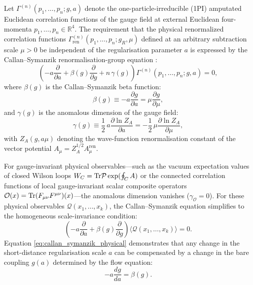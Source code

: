 Let $\Gamma^{(n)}(p_1, \dots, p_n; g, a)$ denote the one-particle-irreducible (1PI) amputated Euclidean correlation functions of the gauge field at external Euclidean four-momenta $p_1, \dots, p_n \in \mathbb{R}^4$. The requirement that the physical renormalized correlation functions $\Gamma_{\mathrm{ren}}^{(n)}(p_1, \dots, p_n; g_R, \mu)$ defined at an arbitrary subtraction scale $\mu > 0$ be independent of the regularisation parameter $a$ is expressed by the Callan--Symanzik renormalisation-group equation \cite{Callan1970,Symanzik1970}:
\begin{equation}
\label{eq:callan_symanzik}
\left( -a \frac{\partial}{\partial a} + \beta(g) \frac{\partial}{\partial g} + n \, \gamma(g) \right) \Gamma^{(n)}(p_1, \dots, p_n; g, a) = 0,
\end{equation}
where $\beta(g)$ is the Callan--Symanzik beta function:
\begin{equation}
\label{eq:beta_def}
\beta(g) \equiv -a \frac{\partial g}{\partial a} = \mu \frac{\partial g}{\partial \mu},
\end{equation}
and $\gamma(g)$ is the anomalous dimension of the gauge field:
\begin{equation}
\label{eq:gamma_def}
\gamma(g) \equiv \frac{1}{2} \, a \frac{\partial \ln Z_A}{\partial a} = -\frac{1}{2} \, \mu \frac{\partial \ln Z_A}{\partial \mu},
\end{equation}
with $Z_A(g, a\mu)$ denoting the wave-function renormalisation constant of the vector potential $A_\mu = Z_A^{1/2} A_{\mu}^{\mathrm{ren}}$.

For gauge-invariant physical observables—such as the vacuum expectation values of closed Wilson loops $W_C = \mathrm{Tr} \mathcal{P} \exp(\oint_C A)$ or the connected correlation functions of local gauge-invariant scalar composite operators $\mathcal{O}(x) = \mathrm{Tr}(F_{\mu\nu} F^{\mu\nu})(x)$—the anomalous dimension vanishes ($\gamma_{\mathcal{O}} = 0$). For these physical observables $\mathcal{Q}(x_1, \dots, x_k)$, the Callan--Symanzik equation simplifies to the homogeneous scale-invariance condition:
\begin{equation}
\label{eq:callan_symanzik_physical}
\left( -a \frac{\partial}{\partial a} + \beta(g) \frac{\partial}{\partial g} \right) \langle \mathcal{Q}(x_1, \dots, x_k) \rangle = 0.
\end{equation}
Equation \eqref{eq:callan_symanzik_physical} demonstrates that any change in the short-distance regularisation scale $a$ can be compensated by a change in the bare coupling $g(a)$ determined by the flow equation:
\begin{equation}
\label{eq:flow_diff_eq}
-a \frac{dg}{da} = \beta(g).
\end{equation}

